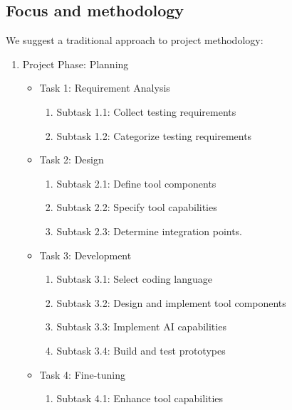 \documentclass[a4paper, 12pt]{article}
\begin{document}
\subsection{Focus and methodology}
We suggest a traditional approach to project methodology:
\begin{enumerate}

\item Project Phase: Planning

\begin{itemize}
\item  Task 1: Requirement Analysis
\begin{enumerate}
\item  Subtask 1.1: Collect testing requirements
\item  Subtask 1.2: Categorize testing requirements
\end{enumerate}

\item  Task 2: Design
\begin{enumerate}
\item  Subtask 2.1: Define tool components
\item  Subtask 2.2: Specify tool capabilities
\item  Subtask 2.3: Determine integration points.
\end{enumerate}

\item  Task 3: Development
\begin{enumerate}
\item  Subtask 3.1: Select coding language
\item  Subtask 3.2: Design and implement tool components
\item  Subtask 3.3: Implement AI capabilities
\item  Subtask 3.4: Build and test prototypes
\end{enumerate}

\item  Task 4: Fine-tuning
\begin{enumerate}
\item  Subtask 4.1: Enhance tool capabilities
\end{enumerate}


\end{itemize}
\end{enumerate}
\end{document}
